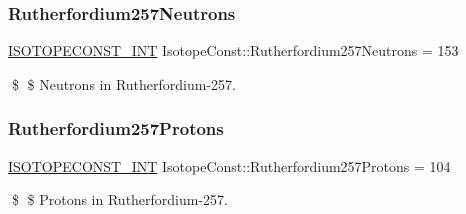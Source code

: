 \subsubsection{\texorpdfstring{Rutherfordium257\+Neutrons}{Rutherfordium257Neutrons}}
{\footnotesize\ttfamily \mbox{\hyperlink{group___isotope_const-_macros_ga5f18360b3e99483a35c32d789e62621c}{I\+S\+O\+T\+O\+P\+E\+C\+O\+N\+S\+T\+\_\+\+I\+NT}} Isotope\+Const\+::\+Rutherfordium257\+Neutrons = 153}

\$ \$ Neutrons in Rutherfordium-\/257. \mbox{\label{group___isotope_const-_rutherfordium-_rf257_gaf69c1cc7690691362f0f392d7bae618a}} 
\subsubsection{\texorpdfstring{Rutherfordium257\+Protons}{Rutherfordium257Protons}}
{\footnotesize\ttfamily \mbox{\hyperlink{group___isotope_const-_macros_ga5f18360b3e99483a35c32d789e62621c}{I\+S\+O\+T\+O\+P\+E\+C\+O\+N\+S\+T\+\_\+\+I\+NT}} Isotope\+Const\+::\+Rutherfordium257\+Protons = 104}

\$ \$ Protons in Rutherfordium-\/257. 